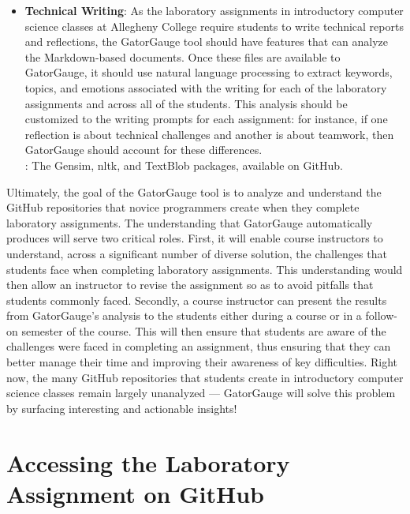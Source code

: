 \documentclass[11pt]{article}
\begin{document}
\begin{itemize}
  \item {\bf Technical Writing}: As the laboratory assignments in introductory computer science classes at Allegheny
    College require students to write technical reports and reflections, the GatorGauge tool should have features that
    can analyze the Markdown-based documents. Once these files are available to GatorGauge, it should use natural
    language processing to extract keywords, topics, and emotions associated with the writing for each of the laboratory
    assignments and across all of the students. This analysis should be customized to the writing prompts for each
    assignment: for instance, if one reflection is about technical challenges and another is about teamwork, then
    GatorGauge should account for these differences. \\[.5em] : The Gensim, nltk, and
    TextBlob packages, available on GitHub.

\end{itemize}

Ultimately, the goal of the GatorGauge tool is to analyze and understand the GitHub repositories that novice programmers
create when they complete laboratory assignments. The understanding that GatorGauge automatically produces will serve
two critical roles. First, it will enable course instructors to understand, across a significant number of diverse
solution, the challenges that students face when completing laboratory assignments. This understanding would then allow
an instructor to revise the assignment so as to avoid pitfalls that students commonly faced. Secondly, a course
instructor can present the results from GatorGauge's analysis to the students either during a course or in a follow-on
semester of the course. This will then ensure that students are aware of the challenges were faced in completing an
assignment, thus ensuring that they can better manage their time and improving their awareness of key difficulties.
Right now, the many GitHub repositories that students create in introductory computer science classes remain largely
unanalyzed --- GatorGauge will solve this problem by surfacing interesting and actionable insights!

\section*{Accessing the Laboratory Assignment on GitHub}
\end{document}
